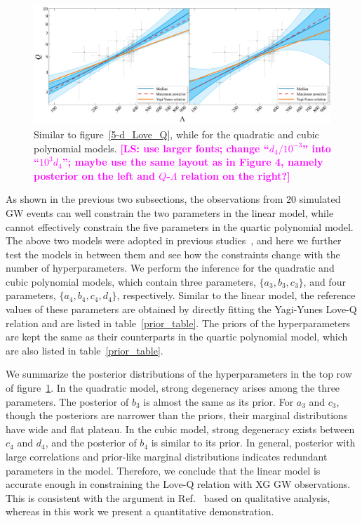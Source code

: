 \documentclass[a4paper,11pt]{article}
\newcommand{\LS}[1]{\textcolor{magenta}{\bf #1}}
\begin{document}
\begin{figure}[t]
    \vspace{3mm}
    \begin{minipage}[t]{\textwidth}
    \includegraphics[width=\linewidth]{fig_hierarchical_results_APR4_3d.pdf}
    \end{minipage}
    \caption{Similar to figure~\ref{5-d_Love_Q}, while for the quadratic and
    cubic polynomial models. \LS{[LS: use larger fonts; change ``$d_4/10^{-3}$''
    into ``$10^3 d_4$''; maybe use the same layout as in Figure 4, namely
    posterior on the left and $Q$-$\Lambda$ relation on the right?]}
    }\label{3-d_4-d_Love_Q}
\end{figure}

As shown in the previous two subsections, the observations from 20 simulated GW 
events can well constrain the two parameters in the linear model, while cannot 
effectively constrain the five parameters in the quartic polynomial model. The
above two models were adopted in previous studies~\cite{Yagi:2013awa,
Samajdar:2020xrd}, and here we further test the models in between them and see
how the constraints change with the number of hyperparameters. We perform the
inference for the quadratic and cubic polynomial models, which contain three
parameters, $\{a_3, b_3, c_3\}$, and four parameters, $\{a_4, b_4, c_4, d_4\}$,
respectively. Similar to the linear model, the reference values of these
parameters are obtained by directly fitting the Yagi-Yunes Love-Q relation and
are listed in table~\ref{prior_table}. The priors of the hyperparameters are
kept the same as their counterparts in the quartic polynomial model, which are
also listed in table~\ref{prior_table}.

We summarize the posterior distributions of the hyperparameters in the top row
of figure~\ref{3-d_4-d_Love_Q}. In the quadratic model, strong degeneracy arises
among the three parameters. The posterior of $b_3$ is almost the same as its 
prior. For $a_3$ and $c_3$, though the posteriors are narrower than the priors, 
their marginal distributions have wide and flat plateau. In the cubic model, 
strong degeneracy  exists between $c_4$ and $d_4$, and the posterior of $b_4$ is
similar to its prior. In general, posterior with large correlations and 
prior-like marginal distributions indicates redundant parameters in the model. 
Therefore, we conclude that the linear model is accurate enough in constraining 
the Love-Q relation with XG GW observations. This is consistent with the
argument in Ref.~\cite{Samajdar:2020xrd} based on qualitative analysis, whereas
in this work we present a quantitative demonstration. 
\end{document}
